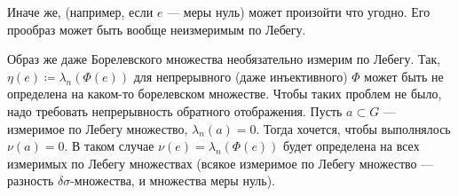 \documentclass[a4paper]{report}
\begin{document}
    Иначе же, (например, если $e$ --- меры нуль) может произойти что угодно.
    Его прообраз может быть вообще неизмеримым по Лебегу.

    Образ же даже Борелевского множества необязательно измерим по Лебегу.
    Так, $\eta(e) \coloneqq \lambda_n(\Phi(e))$ для непрерывного (даже инъективного) $\Phi$ может быть не определена на каком-то борелевском множестве.
    Чтобы таких проблем не было, надо требовать непрерывность обратного отображения.
    Пусть $a \subset G$ --- измеримое по Лебегу множество, $\lambda_n(a) = 0$.
    Тогда хочется, чтобы выполнялось $\nu(a) = 0$.
    В таком случае $\nu(e) = \lambda_n(\Phi(e))$ будет определена на всех измеримых по Лебегу множествах (всякое измеримое по Лебегу множество --- разность $\delta\sigma$-множества, и множества меры нуль).
\end{document}
